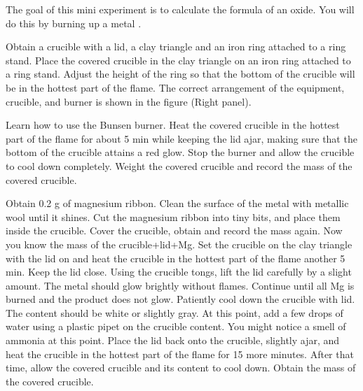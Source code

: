 \documentclass[main.tex]{subfiles}
\begin{document}
\vspace{0.2cm}{\large \bfseries 1. Empirical formula of an oxyde}
The goal of this mini experiment is to calculate the formula of an oxide. You will do this by burning up a metal .
\begin{steps}
      \newstep[] Obtain a crucible with a lid, a clay triangle and an iron ring attached to a ring stand. Place the covered crucible in the clay triangle on an iron ring attached to a ring stand. Adjust the height of the ring so that the bottom of the crucible will be in the hottest part of the flame. The correct arrangement of the equipment, crucible, and burner is shown in the figure (Right panel).   
     




        \newstep[] Learn how to use the Bunsen burner. Heat the covered crucible in the hottest part of the flame for about 5 min while keeping the lid ajar, making sure that the bottom of the crucible attains a red glow.
       \newstep[] Stop the burner and allow the crucible to cool down completely. Weight the covered crucible and record the mass of the covered crucible.     
\end{steps}
\begin{steps}[resume]
    \newstep[] Obtain 0.2 g of magnesium ribbon. Clean the surface of the metal with metallic wool until it shines. Cut the magnesium ribbon into tiny bits, and place them inside the crucible. Cover the crucible, obtain and record the mass again. Now you know the mass of the crucible+lid+Mg.
       \newstep[] Set the crucible on the clay triangle with the lid on and heat the crucible in the hottest part of the flame another 5 min. Keep the lid close. Using the crucible tongs, lift the lid carefully by a slight amount. The metal should glow brightly without flames. Continue until all Mg is burned and the product does not glow.
              \newstep[] Patiently cool down the crucible with lid. The content should be white or slightly gray. At this point, add a few drops of water using a plastic pipet on the crucible content. You might notice a smell of ammonia at this point.
       \newstep[] Place the lid back onto the crucible, slightly ajar, and heat the crucible  in the hottest part of the flame for 15 more minutes. After that time, allow the covered crucible and its content to cool down. Obtain the mass of the covered crucible.
       \end{steps}
      
\end{document}

